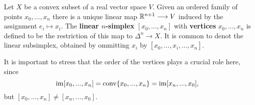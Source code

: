 
	\begin{definition}
		Let $X$ be a convex subset of a real vector space $V$. Given an ordered family of points $x_0,...,x_n$ there is a unique linear map $\mathbb{R}^{n+1} --> V$ induced by the assignment $e_i \mapsto x_i$. The \textbf{linear $n$-simplex} $[x_0,...,x_n]$ with \textbf{vertices} $x_0,...,x_n$ is defined to be the restriction of this map to $\mathbb{\Delta}^n \longrightarrow X$. It is common to denot the linear subsimplex, obtained by ommitting $x_i$ by $[x_0,...,\widehat{x_i},...,x_n]$.

		It is important to stress that the order of the vertices plays a crucial role here, since
		\begin{equation*}
			\operatorname{im} [x_0,...,x_n] = \operatorname{conv} \{x_0,...,x_n\} = \operatorname{im} [x_n,...,x_0],
		\end{equation*}
		but $[x_0,...,x_n] \neq [x_n,...,x_0]$.
	\end{definition}


